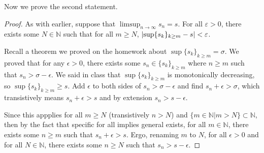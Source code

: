 \documentclass[11pt]{article}
\begin{document}
        Now we prove the second statement.
        \begin{proof}
            As with earlier, suppose that $\limsup_{n \to \infty} s_n = s$.
            For all $\varepsilon > 0$, there exists some $N \in \mathbb{N}$ such that for all $m \geq N$, $\left| \sup\{s_k\}_{k \geq m} - s \right| < \varepsilon$.

            Recall a theorem we proved on the homework about $\sup\{s_k\}_{k \geq m} = \sigma$.
            We proved that for any $\epsilon > 0$, there exists some $s_n \in \{s_k\}_{k \geq m}$ where $n \geq m$ such that $s_n > \sigma - \epsilon$.
            We said in class that $\sup\{s_k\}_{k \geq m}$ is monotonically decreasing, so $\sup\{s_k\}_{k \geq m} \geq s$.
            Add $\epsilon$ to both sides of $s_n > \sigma - \epsilon$ and find $s_n + \epsilon > \sigma$, which transistively means $s_n + \epsilon > s$ and by extension $s_n > s - \epsilon$.

            Since this appplies for all $m \geq N$ (transistively $n > N$) and $\{m \in \mathbb{N} \Big| m > N\} \subset \mathbb{N}$, then by the fact that specific for all implies general exists, for all $m \in \mathbb{N}$, there exists some $n \geq m$ such that $s_n + \epsilon > s$.
            Ergo, renaming $m$ to $N$, for all $\epsilon > 0$ and for all $N \in \mathbb{N}$, there exists some $n \geq N$ such that $s_n > s - \epsilon$.
        \end{proof}
\end{document}
